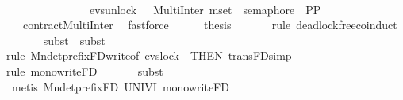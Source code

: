 \begin{isabellebody}
\ \ \ \ \ \ \ \ \ \ \ \ \ \ {\isacharequal}{\kern0pt}\ \isanewline
\ \ \ \ \ \ \ \ \ \ \ \ \ \ \ {\isacharparenleft}{\kern0pt}evs{\isachardot}{\kern0pt}unlock\ {}\ {\isasymrightarrow}\ {\isacharparenleft}{\kern0pt}{\isacharparenleft}{\kern0pt}MultiInter\ {\isacharparenleft}{\kern0pt}mset\ {\isacharbrackleft}{\kern0pt}{}{\isachardot}{\kern0pt}{\isachardot}{\kern0pt}{}{\isacharbrackright}{\kern0pt}{\isacharparenright}{\kern0pt}\ semaphore{\isacharparenright}{\kern0pt}\ {\isacharbar}{\kern0pt}{\isacharbar}{\kern0pt}\ {\isacharparenleft}{\kern0pt}{\isacharquery}{\kern0pt}P{}{\isacharbar}{\kern0pt}{\isacharbar}{\kern0pt}{\isacharbar}{\kern0pt}{\isacharquery}{\kern0pt}P{}{\isacharparenright}{\kern0pt}{\isacharparenright}{\kern0pt}{\isacharparenright}{\kern0pt}{\isacartoucheclose}\isanewline
\ \ \ \ \ \ \ \ \ \ \ \ \ \isamarkupfalse%
\ {}\ {}\ contractMultiInter{}{\isacharprime}{\kern0pt}{\isacharprime}{\kern0pt}\ \isamarkupfalse%
\ fastforce\isanewline
\ \ \ \ \isamarkupfalse%
\ {\isacharquery}{\kern0pt}thesis\isanewline
\ \ \ \ \ \ \isamarkupfalse%
{\isacharparenleft}{\kern0pt}rule\ deadlock{\isacharunderscore}{\kern0pt}free{\isacharunderscore}{\kern0pt}{}{\isacharunderscore}{\kern0pt}coinduct{\isacharparenright}{\kern0pt}\ \isanewline
\ \ \ \ \ \ \isamarkupfalse%
{\isacharparenleft}{\kern0pt}subst\ {}{\isacharcomma}{\kern0pt}\ subst\ {}{\isacharparenright}{\kern0pt}\isanewline
\ \ \ \ \ \ \isamarkupfalse%
{\isacharparenleft}{\kern0pt}rule\ Mndetprefix{\isacharunderscore}{\kern0pt}FD{\isacharunderscore}{\kern0pt}write{}{\isacharbrackleft}{\kern0pt}of\ {\isacartoucheopen}evs{\isachardot}{\kern0pt}lock\ {}{\isacartoucheclose}{\isacharcomma}{\kern0pt}\ THEN\ trans{\isacharunderscore}{\kern0pt}FD{\isacharbrackright}{\kern0pt}{\isacharcomma}{\kern0pt}simp{\isacharparenright}{\kern0pt}\isanewline
\ \ \ \ \ \ \isamarkupfalse%
{\isacharparenleft}{\kern0pt}rule\ mono{\isacharunderscore}{\kern0pt}write{}{\isacharunderscore}{\kern0pt}FD{\isacharparenright}{\kern0pt}\isanewline
\ \ \ \ \ \ \isamarkupfalse%
{\isacharparenleft}{\kern0pt}subst\ {}{\isacharparenright}{\kern0pt}\ \isanewline
\ \ \ \ \ \ \isamarkupfalse%
\ {\isacharparenleft}{\kern0pt}metis\ Mndetprefix{\isacharunderscore}{\kern0pt}FD\ UNIV{\isacharunderscore}{\kern0pt}I\ mono{\isacharunderscore}{\kern0pt}write{}{\isacharunderscore}{\kern0pt}FD{\isacharparenright}{\kern0pt}\isanewline

\end{isabellebody}
